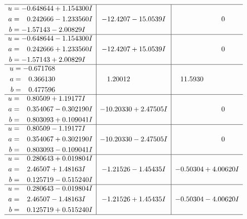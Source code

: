 \documentclass[1p]{elsarticle_modified}
\theoremstyle{definition}
\begin{document}
$$\begin{array}{c|c|c}
 \hline 
\begin{aligned}
u &= -0.648644 + 1.154300 I \\
a &= \phantom{-}0.242666 - 1.233560 I \\
b &= -1.57143 - 2.00829 I\end{aligned}
 & -12.4207 - 15.0539 I & \phantom{-0.000000 } 0 \\ \hline\begin{aligned}
u &= -0.648644 - 1.154300 I \\
a &= \phantom{-}0.242666 + 1.233560 I \\
b &= -1.57143 + 2.00829 I\end{aligned}
 & -12.4207 + 15.0539 I & \phantom{-0.000000 } 0 \\ \hline\begin{aligned}
u &= -0.671768\phantom{ +0.000000I} \\
a &= \phantom{-}0.366130\phantom{ +0.000000I} \\
b &= \phantom{-}0.477596\phantom{ +0.000000I}\end{aligned}
 & \phantom{-}1.20012\phantom{ +0.000000I} & \phantom{-}11.5930\phantom{ +0.000000I} \\ \hline\begin{aligned}
u &= \phantom{-}0.80509 + 1.19177 I \\
a &= \phantom{-}0.354067 - 0.302190 I \\
b &= \phantom{-}0.803093 + 0.109041 I\end{aligned}
 & -10.20330 + 2.47505 I & \phantom{-0.000000 } 0 \\ \hline\begin{aligned}
u &= \phantom{-}0.80509 - 1.19177 I \\
a &= \phantom{-}0.354067 + 0.302190 I \\
b &= \phantom{-}0.803093 - 0.109041 I\end{aligned}
 & -10.20330 - 2.47505 I & \phantom{-0.000000 } 0 \\ \hline\begin{aligned}
u &= \phantom{-}0.280643 + 0.019804 I \\
a &= \phantom{-}2.46507 + 1.48163 I \\
b &= \phantom{-}0.125719 - 0.515240 I\end{aligned}
 & -1.21526 - 1.45435 I & -0.50304 + 4.00620 I \\ \hline\begin{aligned}
u &= \phantom{-}0.280643 - 0.019804 I \\
a &= \phantom{-}2.46507 - 1.48163 I \\
b &= \phantom{-}0.125719 + 0.515240 I\end{aligned}
 & -1.21526 + 1.45435 I & -0.50304 - 4.00620 I\\
 \hline 
 \end{array}$$\newpage\newpage\renewcommand{\arraystretch}{1}
\end{document}
